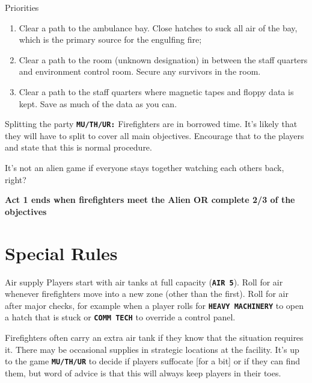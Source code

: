 \begin{rpg-commentbox}{Priorities}
    \begin{enumerate}
        \item Clear a path to the ambulance bay. Close hatches to suck all air of the bay, which is the primary source for the engulfing fire;
        \item Clear a path to the room (unknown designation) in between the staff quarters and environment control room. Secure any survivors in the room.
        \item Clear a path to the staff quarters where magnetic tapes and floppy data is kept. Save as much of the data as you can.
    \end{enumerate}
\end{rpg-commentbox}



\begin{rpg-commentbox}{Splitting the party}
    \texttt{\textbf{MU/TH/UR:}} Firefighters are in borrowed time. It's likely that they will have to split to cover all main objectives. Encourage that to the players and state that this is normal procedure. 

    It's not an alien game if everyone stays together watching each others back, right?
\end{rpg-commentbox}  

\begin{rpg-commentbox}{}
    \textbf{Act 1 ends when firefighters meet the Alien OR complete 2/3 of the objectives}
 \end{rpg-commentbox}

 \newsect


\section{Special Rules}

\begin{rpg-commentbox}{Air supply}
    Players start with air tanks at full capacity (\texttt{\textbf{AIR 5}}). Roll for air whenever firefighters move into a new zone (other than the first). Roll for air after major checks, for example when a player rolls for \texttt{\textbf{HEAVY MACHINERY}} to open a hatch that is stuck or \texttt{\textbf{COMM TECH}} to override a control panel.

    Firefighters often carry an extra air tank if they know that the situation requires it. 
    There may be occasional supplies in strategic locations at the facility. It's up to the game \texttt{\textbf{MU/TH/UR}} to decide if players suffocate [for a bit] or if they can find them, but word of advice is that this will always keep players in their toes. 
\end{rpg-commentbox}  


